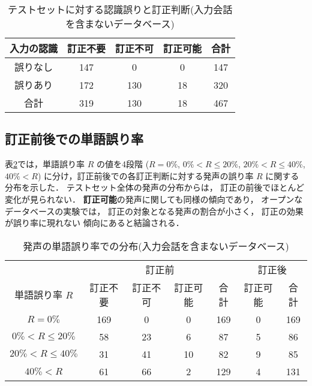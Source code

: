 \begin{table}
\begin{center}
\caption{テストセットに対する認識誤りと訂正判断(入力会話を含まないデータベース)}
\label{JE-db-open-judgement}
\begin{tabular}{|c||c|c|c||c|} \hline
入力の認識 & 訂正不要  & 訂正不可 & 訂正可能 & 合計\\ \hline\hline
誤りなし & 147 & 0 & 0 & 147 \\ \hline
誤りあり & 172 & 130 & 18 & 320 \\ \hline\hline
合計 & 319 & 130 & 18 & 467 \\ \hline
\end{tabular}
\end{center}
\end{table}


\subsection{訂正前後での単語誤り率}

表\ref{JE-db-open-R-rank}では，単語誤り率 $R$ の値を4段階
($R = 0\%$, $0\% < R \leq 20\%$, $20\% < R \leq 40\%$, $40\% < R$)
に分け，訂正前後での各訂正判断に対する発声の誤り率 $R$ に関する
分布を示した．
テストセット全体の発声の分布からは，
訂正の前後でほとんど変化が見られない．
{\bf 訂正可能}の発声に関しても同様の傾向であり，
オープンなデータベースの実験では，
{訂正の対象となる発声の割合が小さく，
訂正の効果が誤り率に現れない}
傾向にあると結論される．

\begin{table}
\begin{center}
\caption{発声の単語誤り率での分布(入力会話を含まないデータベース)}
\label{JE-db-open-R-rank}
\begin{tabular}{|c||c|c|c||c||c||c|} \hline
 & \multicolumn{4}{c||}{訂正前} & \multicolumn{2}{c|}{訂正後}\\ \cline{2-7}
単語誤り率 $R$ & 訂正不要 & 訂正不可 & 訂正可能 & 合計 & 訂正可能 & 合計\\ \hline\hline
$R = 0\%$ & 169 & 0 & 0 & 169 & 0 & 169 \\ \hline
$0\% < R \leq 20\%$ & 58 & 23 & 6 & 87 & 5 & 86 \\ \hline
$20\% < R \leq 40\%$ & 31 & 41 & 10 & 82 & 9 & 85 \\ \hline
$40\% < R$ & 61 & 66 & 2 & 129 & 4 & 131 \\ \hline
\end{tabular}
\end{center}
\end{table}

